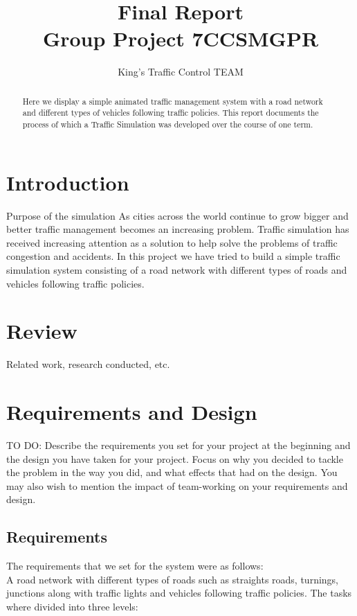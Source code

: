 \documentclass{article}[11pt,Tahoma]
\begin{document}
	\title{Final Report\\ Group Project 7CCSMGPR} 	
    \author{King's Traffic Control TEAM}
	\maketitle
	\begin{abstract}
		Here we display a simple animated traffic management system with a road network and different types of vehicles following traffic policies. This report documents the process of which a Traffic Simulation was developed over the course of one term.
	\end{abstract}
	\clearpage
	\tableofcontents
	\section{Introduction}
		Purpose of the simulation
		As cities across the world continue to grow bigger and better traffic management becomes an increasing problem. Traffic simulation has received increasing attention as a solution to help solve the problems of traffic congestion and accidents. In this project we have tried to build a simple traffic simulation system consisting of a road network with different types of roads and vehicles following traffic policies.
	\section{Review}
		Related work, research conducted, etc.
	\section{Requirements and Design}
		TO DO: Describe the requirements you set for your project at the beginning and the design you have taken for your project. Focus on why you decided to tackle the problem in the way you did, and what effects that had on the design. You may also wish to mention the impact of team-working on your requirements and design.
			\subsection{Requirements}
			The requirements that we set for the system were as follows: 
			\\A road network with different types of roads such as straights roads, turnings, junctions along with traffic lights and vehicles following traffic policies.
			 The tasks where divided into three levels:
			
\end{document}
